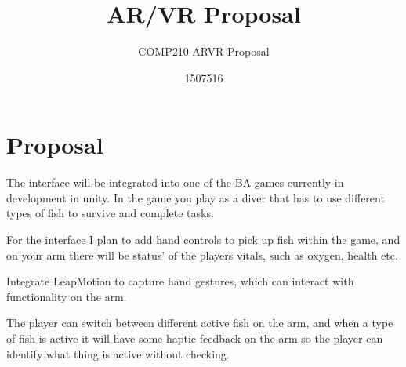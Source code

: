 \documentclass{scrartcl}
\title{AR/VR Proposal }
\subtitle{COMP210-ARVR Proposal}
\author{1507516}
\begin{document}
\maketitle

\section{Proposal}

The interface will be integrated into one of the BA games currently in development in unity. 
In the game you play as a diver that has to use different types of fish to survive and complete tasks.

For the interface I plan to add hand controls to pick up fish within the game, and on your arm there will be status' of the players vitals, such as oxygen, health etc.

Integrate LeapMotion to capture hand gestures, which can interact with functionality on the arm.

The player can switch between different active fish on the arm, and when a type of fish is active it will have some haptic feedback on the arm so the player can identify what thing is active without checking.


\end{document}
